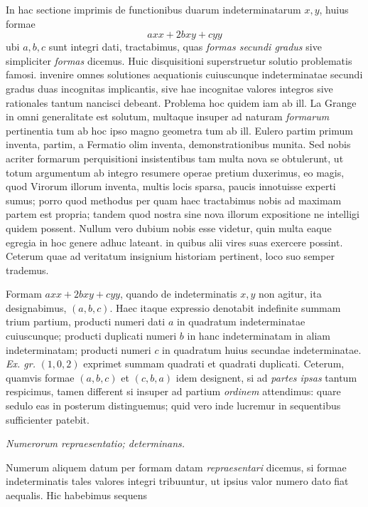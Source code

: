 In hac sectione imprimis de functionibus duarum indeterminatarum $x,y$, huius formae
\[
axx+2bxy+cyy
\]
ubi $a,b,c$ sunt integri dati, tractabimus, quas \textit{formas secundi gradus} sive simpliciter \textit{formas} dicemus. Huic disquisitioni superstruetur solutio problematis famosi. invenire omnes solutiones aequationis cuiuscunque indeterminatae secundi gradus duas incognitas implicantis, sive hae incognitae valores integros sive rationales tantum nancisci debeant. Problema hoc quidem iam ab ill. La Grange in omni generalitate est solutum, multaque insuper ad naturam \textit{formarum} pertinentia tum ab hoc ipso magno geometra tum ab ill. Eulero partim primum inventa, partim, a Fermatio olim inventa, demonstrationibus munita. Sed nobis acriter formarum perquisitioni insistentibus tam multa nova se obtulerunt, ut totum argumentum ab integro resumere operae pretium duxerimus, eo magis, quod Virorum illorum inventa, multis locis sparsa, paucis innotuisse experti sumus; porro quod methodus per quam haec tractabimus nobis ad maximam partem est propria; tandem
quod nostra sine nova illorum expositione ne intelligi quidem possent. Nullum vero dubium nobis esse videtur, quin multa eaque egregia in hoc genere adhuc lateant. in quibus alii vires suas exercere possint. Ceterum quae ad veritatum insignium historiam pertinent, loco suo semper trademus.

Formam $axx+2bxy+cyy$, quando de indeterminatis $x,y$ non agitur, ita designabimus, $(a,b,c)$. Haec itaque expressio denotabit indefinite summam trium partium, producti numeri dati $a$ in quadratum indeterminatae cuiuscunque; producti duplicati numeri $b$ in hanc indeterminatam in aliam indeterminatam; producti numeri $c$ in quadratum huius secundae indeterminatae. \textit{Ex. gr.} $(1,0,2)$ exprimet summam quadrati et quadrati duplicati. Ceterum, quamvis formae $(a,b,c)$ et $(c,b,a)$ idem designent, si ad \textit{partes ipsas} tantum respicimus, tamen different si insuper ad partium \textit{ordinem} attendimus: quare sedulo eas in posterum distinguemus; quid vero inde lucremur in sequentibus sufficienter patebit.

\begin{center}
\textit{Numerorum repraesentatio; determinans.}
\end{center}

Numerum aliquem datum per formam datam \textit{repraesentari} dicemus, si formae indeterminatis tales valores integri tribuuntur, ut ipsius valor numero dato fiat aequalis. Hic habebimus sequens

